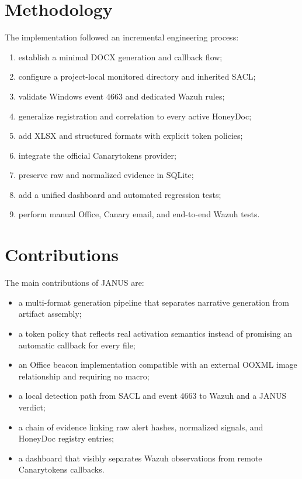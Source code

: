\section{Methodology}

The implementation followed an incremental engineering process:

\begin{enumerate}[label=\arabic*.]
  \item establish a minimal DOCX generation and callback flow;
  \item configure a project-local monitored directory and inherited SACL;
  \item validate Windows event 4663 and dedicated Wazuh rules;
  \item generalize registration and correlation to every active HoneyDoc;
  \item add XLSX and structured formats with explicit token policies;
  \item integrate the official Canarytokens provider;
  \item preserve raw and normalized evidence in SQLite;
  \item add a unified dashboard and automated regression tests;
  \item perform manual Office, Canary email, and end-to-end Wazuh tests.
\end{enumerate}

\section{Contributions}

The main contributions of JANUS are:

\begin{itemize}
  \item a multi-format generation pipeline that separates narrative generation
  from artifact assembly;
  \item a token policy that reflects real activation semantics instead of
  promising an automatic callback for every file;
  \item an Office beacon implementation compatible with an external OOXML image
  relationship and requiring no macro;
  \item a local detection path from SACL and event 4663 to Wazuh and a JANUS
  verdict;
  \item a chain of evidence linking raw alert hashes, normalized signals, and
  HoneyDoc registry entries;
  \item a dashboard that visibly separates Wazuh observations from remote
  Canarytokens callbacks.
\end{itemize}

